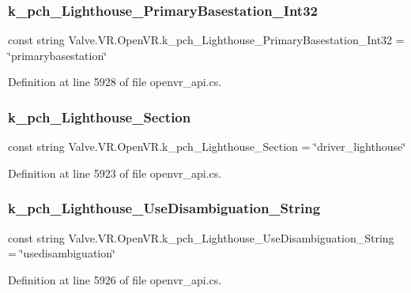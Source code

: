 \subsubsection{\texorpdfstring{k\_pch\_Lighthouse\_PrimaryBasestation\_Int32}{k\_pch\_Lighthouse\_PrimaryBasestation\_Int32}}
{\footnotesize\ttfamily const string Valve.\+V\+R.\+Open\+V\+R.\+k\+\_\+pch\+\_\+\+Lighthouse\+\_\+\+Primary\+Basestation\+\_\+\+Int32 = \char`\"{}primarybasestation\char`\"{}}



Definition at line 5928 of file openvr\+\_\+api.\+cs.

\mbox{\label{class_valve_1_1_v_r_1_1_open_v_r_a529da3ed5ec61d0c4c9bb1fc6860412d}} 
\subsubsection{\texorpdfstring{k\_pch\_Lighthouse\_Section}{k\_pch\_Lighthouse\_Section}}
{\footnotesize\ttfamily const string Valve.\+V\+R.\+Open\+V\+R.\+k\+\_\+pch\+\_\+\+Lighthouse\+\_\+\+Section = \char`\"{}driver\+\_\+lighthouse\char`\"{}}



Definition at line 5923 of file openvr\+\_\+api.\+cs.

\mbox{\label{class_valve_1_1_v_r_1_1_open_v_r_a9b6c7b9244726fef2863041c67f9a79e}} 
\subsubsection{\texorpdfstring{k\_pch\_Lighthouse\_UseDisambiguation\_String}{k\_pch\_Lighthouse\_UseDisambiguation\_String}}
{\footnotesize\ttfamily const string Valve.\+V\+R.\+Open\+V\+R.\+k\+\_\+pch\+\_\+\+Lighthouse\+\_\+\+Use\+Disambiguation\+\_\+\+String = \char`\"{}usedisambiguation\char`\"{}}



Definition at line 5926 of file openvr\+\_\+api.\+cs.

